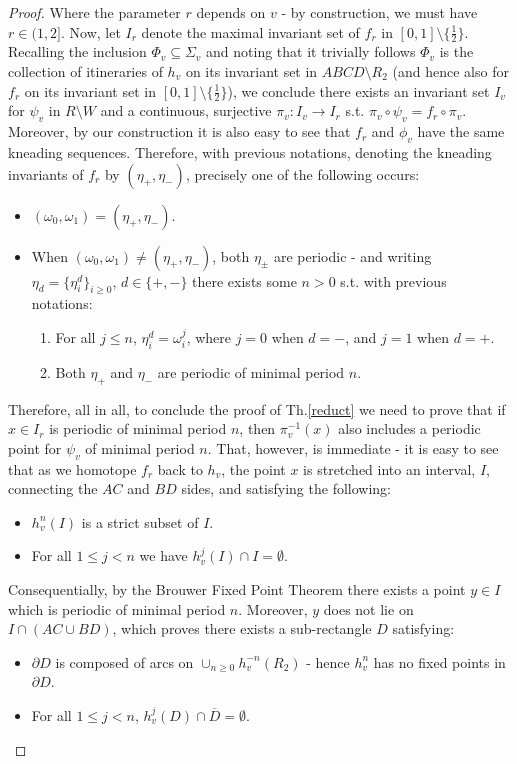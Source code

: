 \documentclass[10pt,reqno]{amsart}
\theoremstyle{plain}
\theoremstyle{assumption}
\theoremstyle{notation}
\theoremstyle{claim}
\theoremstyle{conj}
\theoremstyle{theorem}
\theoremstyle{proposition}
\theoremstyle{corollary}
\begin{document}
\begin{proof}
Where the parameter $r$ depends on $v$ - by construction, we must have $r\in(1,2]$. Now, let $I_r$ denote the maximal invariant set of $f_r$ in $[0,1]\setminus\{\frac{1}{2}\}$. Recalling the inclusion $\Phi_v\subseteq\Sigma_v$ and noting that it trivially follows $\Phi_v$ is the collection of itineraries of $h_v$ on its invariant set in $ABCD\setminus R_2$ (and hence also for $f_r$ on its invariant set in $[0,1]\setminus\{\frac{1}{2}\}$), we conclude there exists an invariant set $I_v$ for $\psi_v$ in $R\setminus W$ and a continuous, surjective $\pi_v:I_v\to I_r$ s.t. $\pi_v\circ\psi_v=f_r\circ\pi_v$. Moreover, by our construction it is also easy to see that $f_r$ and $\phi_v$ have the same kneading sequences. Therefore, with previous notations, denoting the kneading invariants of $f_r$ by $(\eta_+,\eta_-)$, precisely one of the following occurs:
\begin{itemize}
    \item $(\omega_0,\omega_1)=(\eta_+,\eta_-)$.
    \item When $(\omega_0,\omega_1)\ne(\eta_+,\eta_-)$, both $\eta_\pm$ are periodic - and writing $\eta_d=\{\eta^d_i\}_{i\geq0}$, $d\in\{+,-\}$ there exists some $n>0$ s.t. with previous notations:
    \begin{enumerate}
    \item For all $j\leq n$, $\eta^d_i=\omega^j_i$, where $j=0$ when $d=-$, and $j=1$ when $d=+$.
    \item Both $\eta_+$ and $\eta_-$ are periodic of minimal period $n$.
    \end{enumerate}
\end{itemize}

Therefore, all in all, to conclude the proof of Th.\ref{reduct} we need to prove that if $x\in I_r$ is periodic of minimal period $n$, then $\pi^{-1}_v(x)$ also includes a periodic point for $\psi_v$ of minimal period $n$. That, however, is immediate - it is easy to see that as we homotope $f_r$ back to $h_v$, the point $x$ is stretched into an interval, $I$, connecting the $AC$ and $BD$ sides, and satisfying the following:

\begin{itemize}
    \item $h^n_v(I)$ is a strict subset of $I$.
    \item For all $1\leq j<n$ we have $h_v^j(I)\cap I=\emptyset$.
\end{itemize}

Consequentially, by the Brouwer Fixed Point Theorem there exists a point $y\in I$ which is periodic of minimal period $n$. Moreover, $y$ does not lie on $I\cap(AC\cup BD)$, which proves there exists a sub-rectangle $D$ satisfying:
\begin{itemize}
    \item $\partial D$ is composed of arcs on $\cup_{n\geq0}h^{-n}_v(R_2)$ - hence $h^n_v$ has no fixed points in $\partial D$.
    \item For all $1\leq j<n$, $h^j_v(D)\cap\overline{D}=\emptyset$.
\end{itemize}


\end{proof}
\end{document}
